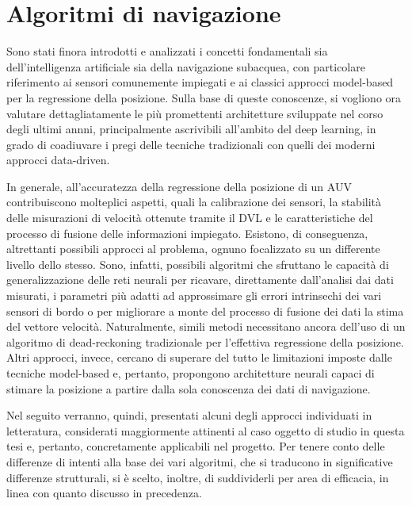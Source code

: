 
\chapter{Algoritmi di navigazione}

Sono stati finora introdotti e analizzati i concetti fondamentali sia dell'intelligenza artificiale sia della navigazione subacquea, con particolare riferimento ai sensori comunemente impiegati e ai classici approcci model-based per la regressione della posizione. Sulla base di queste conoscenze, si vogliono ora valutare dettagliatamente le più promettenti architetture sviluppate nel corso degli ultimi annni, principalmente ascrivibili all'ambito del deep learning, in grado di coadiuvare i pregi delle tecniche tradizionali con quelli dei moderni approcci data-driven. 

In generale, all'accuratezza della regressione della posizione di un AUV contribuiscono molteplici aspetti, quali la calibrazione dei sensori, la stabilità delle misurazioni di velocità ottenute tramite il DVL e le caratteristiche del processo di fusione delle informazioni impiegato. Esistono, di conseguenza, altrettanti possibili approcci al problema, ognuno focalizzato su un differente livello dello stesso. Sono, infatti, possibili algoritmi che sfruttano le capacità di generalizzazione delle reti neurali per ricavare, direttamente dall'analisi dai dati misurati, i parametri più adatti ad approssimare gli errori intrinsechi dei vari sensori di bordo o per migliorare a monte del processo di fusione dei dati la stima del vettore velocità. Naturalmente, simili metodi necessitano ancora dell'uso di un algoritmo di dead-reckoning tradizionale per l'effettiva regressione della posizione. Altri approcci, invece, cercano di superare del tutto le limitazioni imposte dalle tecniche model-based e, pertanto, propongono architetture neurali capaci di stimare la posizione a partire dalla sola conoscenza dei dati di navigazione. 

Nel seguito verranno, quindi, presentati alcuni degli approcci individuati in letteratura, considerati maggiormente attinenti al caso oggetto di studio in questa tesi e, pertanto, concretamente applicabili nel progetto. Per tenere conto delle differenze di intenti alla base dei vari algoritmi, che si traducono in significative differenze strutturali, si è scelto, inoltre, di suddividerli per area di efficacia, in linea con quanto discusso in precedenza. 


